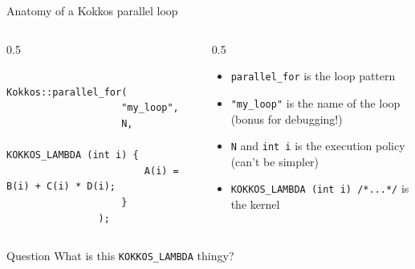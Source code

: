 \documentclass[
    aspectratio=169,
]{beamer}
\begin{document}
\begin{frame}[fragile]{Anatomy of a Kokkos parallel loop}
    \begin{columns}
        \begin{column}{0.5\linewidth}
            \begin{verbatim}
                Kokkos::parallel_for(
                    "my_loop",
                    N,
                    KOKKOS_LAMBDA (int i) {
                        A(i) = B(i) + C(i) * D(i);
                    }
                );
            \end{verbatim}
        \end{column}
        \begin{column}{0.5\linewidth}
            \begin{itemize}
                \item \texttt{parallel_for} is the loop pattern
                \item \texttt{"my_loop"} is the name of the loop (bonus for debugging!)
                \item \texttt{N} and \texttt{int i} is the execution policy (can't be simpler)
                \item \texttt{KOKKOS_LAMBDA (int i) {/*...*/}} is the kernel
            \end{itemize}
        \end{column}
    \end{columns}

    \pause

    \begin{block}{Question}
         What is this \texttt{KOKKOS\_LAMBDA} thingy?
    \end{block}
\end{frame}
\end{document}
